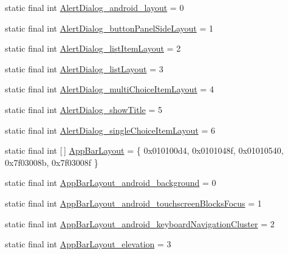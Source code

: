 \begin{DoxyCompactItemize}
\item 
static final int \mbox{\hyperlink{classandroid_1_1support_1_1design_1_1R_1_1styleable_a71bc85e6ec9ee647058ddec18999bc91}{Alert\+Dialog\+\_\+android\+\_\+layout}} = 0
\item 
static final int \mbox{\hyperlink{classandroid_1_1support_1_1design_1_1R_1_1styleable_a409ae73aecd7c9e5a57bc54add92d3ce}{Alert\+Dialog\+\_\+button\+Panel\+Side\+Layout}} = 1
\item 
static final int \mbox{\hyperlink{classandroid_1_1support_1_1design_1_1R_1_1styleable_a65581c0e854793dd465d4fd5571d102e}{Alert\+Dialog\+\_\+list\+Item\+Layout}} = 2
\item 
static final int \mbox{\hyperlink{classandroid_1_1support_1_1design_1_1R_1_1styleable_a8fafa3e0c1cdb4161960369a508c8a96}{Alert\+Dialog\+\_\+list\+Layout}} = 3
\item 
static final int \mbox{\hyperlink{classandroid_1_1support_1_1design_1_1R_1_1styleable_a77a0dbf6bd7bd9b4f3b521a0e75826b5}{Alert\+Dialog\+\_\+multi\+Choice\+Item\+Layout}} = 4
\item 
static final int \mbox{\hyperlink{classandroid_1_1support_1_1design_1_1R_1_1styleable_ab0bb353b16886aa91970d5f8234922b7}{Alert\+Dialog\+\_\+show\+Title}} = 5
\item 
static final int \mbox{\hyperlink{classandroid_1_1support_1_1design_1_1R_1_1styleable_a3740e6ae8888268dd6b9ed155ea53f8e}{Alert\+Dialog\+\_\+single\+Choice\+Item\+Layout}} = 6
\item 
static final int \mbox{[}$\,$\mbox{]} \mbox{\hyperlink{classandroid_1_1support_1_1design_1_1R_1_1styleable_ad4af8881949a584d986f4bfadb3e8482}{App\+Bar\+Layout}} = \{ 0x010100d4, 0x0101048f, 0x01010540, 0x7f03008b, 0x7f03008f \}
\item 
static final int \mbox{\hyperlink{classandroid_1_1support_1_1design_1_1R_1_1styleable_ae73de4f6a34a79953b359c4b89876a2d}{App\+Bar\+Layout\+\_\+android\+\_\+background}} = 0
\item 
static final int \mbox{\hyperlink{classandroid_1_1support_1_1design_1_1R_1_1styleable_a6bfe17f5cc1f4599f04120c3ee8b6375}{App\+Bar\+Layout\+\_\+android\+\_\+touchscreen\+Blocks\+Focus}} = 1
\item 
static final int \mbox{\hyperlink{classandroid_1_1support_1_1design_1_1R_1_1styleable_a5a0eb62cecd5001adfdd4b39bb7f715e}{App\+Bar\+Layout\+\_\+android\+\_\+keyboard\+Navigation\+Cluster}} = 2
\item 
static final int \mbox{\hyperlink{classandroid_1_1support_1_1design_1_1R_1_1styleable_aa5bd8cba190544da5bbd7dcf760146ce}{App\+Bar\+Layout\+\_\+elevation}} = 3

\end{DoxyCompactItemize}
